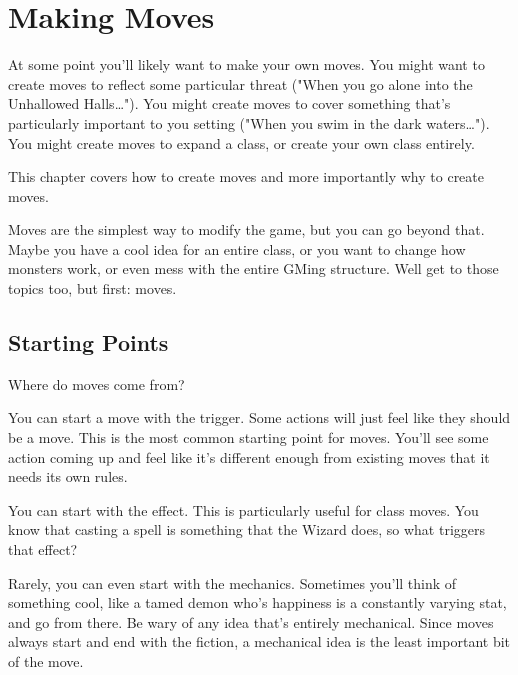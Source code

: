 \chapter{Making Moves}
  
            

At some point you'll likely want to make your own moves. You might want to create moves to reflect some particular threat ("When you go alone into the Unhallowed Halls…"). You might create moves to cover something that's particularly important to you setting ("When you swim in the dark waters…"). You might create moves to expand a class, or create your own class entirely.

       

This chapter covers how to create moves and more importantly why to create moves.

       

Moves are the simplest way to modify the game, but you can go beyond that. Maybe you have a cool idea for an entire class, or you want to change how monsters work, or even mess with the entire GMing structure. Well get to those topics too, but first: moves.

       
\section{Starting Points}   
       

Where do moves come from?

       

You can start a move with the trigger. Some actions will just feel like they should be a move. This is the most common starting point for moves. You'll see some action coming up and feel like it's different enough from existing moves that it needs its own rules.

       

You can start with the effect. This is particularly useful for class moves. You know that casting a spell is something that the Wizard does, so what triggers that effect?

       

Rarely, you can even start with the mechanics. Sometimes you'll think of something cool, like a tamed demon who's happiness is a constantly varying stat, and go from there. Be wary of any idea that's entirely mechanical. Since moves always start and end with the fiction, a mechanical idea is the least important bit of the move.

       

